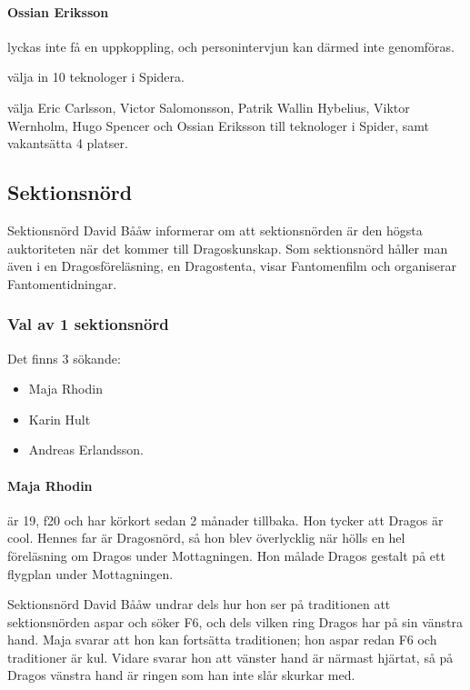 \documentclass[hidelinks]{sektionsmote}
\begin{document}
\paragraph{Ossian Eriksson} lyckas inte få en uppkoppling, och personintervjun kan därmed inte genomföras.

\begin{beslut}
  \item välja in 10 teknologer i Spidera.
  \item välja Eric Carlsson, Victor Salomonsson, Patrik Wallin Hybelius, Viktor Wernholm, Hugo Spencer och Ossian Eriksson till teknologer i Spider, samt vakantsätta 4 platser.
\end{beslut}


\subsection{Sektionsnörd}
Sektionsnörd David Bååw informerar om att sektionsnörden är den högsta auktoriteten när det kommer till Dragoskunskap.
Som sektionsnörd håller man även i en Dragosföreläsning, en Dragostenta, visar Fantomenfilm och organiserar Fantomentidningar.

\subsubsection{Val av 1 sektionsnörd}
Det finns 3 sökande:
\begin{itemize}
    \item Maja Rhodin
    \item Karin Hult
    \item Andreas Erlandsson.
\end{itemize}

\paragraph{Maja Rhodin} är 19, f20 och har körkort sedan 2 månader tillbaka.
Hon tycker att Dragos är cool.
Hennes far är Dragosnörd, så hon blev överlycklig när hölls en hel föreläsning om Dragos under Mottagningen.
Hon målade Dragos gestalt på ett flygplan under Mottagningen.

Sektionsnörd David Bååw undrar dels hur hon ser på traditionen att sektionsnörden aspar och söker F6, och dels vilken ring Dragos har på sin vänstra hand.
Maja svarar att hon kan fortsätta traditionen; hon aspar redan F6 och traditioner är kul.
Vidare svarar hon att vänster hand är närmast hjärtat, så på Dragos vänstra hand är ringen som han inte slår skurkar med.
\end{document}
